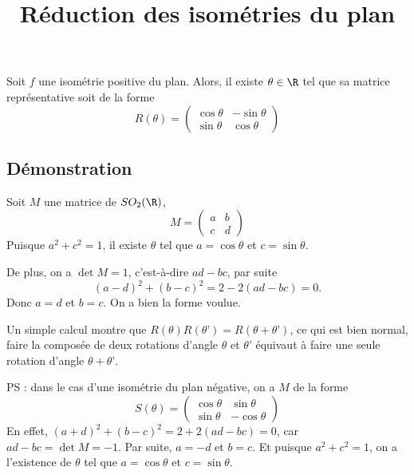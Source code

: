 \documentclass[fontsize=12pt,twoside=false,parskip=half]{scrartcl}
\title{Réduction des isométries du plan}
\date{}
\author{}
\begin{document}
\maketitle
   \begin{Theoreme}
      Soit $f$ une isométrie positive du plan. Alors, il existe $\theta \in \R$ 
      tel que sa matrice représentative soit de la forme
      \[
         R(\theta) = 
         \begin{pmatrix}
            \cos \theta & -\sin \theta \\
            \sin \theta & \cos \theta
         \end{pmatrix}
      \]
   \end{Theoreme}
   \subsection{Démonstration}
      Soit $M$ une matrice de $SO_2(\R)$, 
      \[
         M = 
         \begin{pmatrix}
            a & b \\
            c & d
         \end{pmatrix}
      \]
      Puisque $a^2 + c^2 = 1$, il existe $\theta$ tel que $a = \cos \theta$ et
      $c = \sin \theta$.
      
      De plus, on a $\det M = 1$, c’est-à-dire $ad - bc$, par suite
      \[
         (a - d)^2 + (b - c)^2 = 2 - 2(ad - bc) = 0.
      \]
      Donc $a = d$ et $b = c$. On a bien la forme voulue.
      
      Un simple calcul montre que $R(\theta)R(\theta’) = R(\theta + \theta’)$,
      ce qui est bien normal, faire la composée de deux rotations d’angle $\theta$ 
      et $\theta’$ équivaut à faire une seule rotation d’angle $\theta + \theta’$.
      
      PS : dans le cas d’une isométrie du plan négative, on a $M$ de la forme
      \[
         S(\theta) = 
         \begin{pmatrix}
            \cos \theta & \sin \theta \\
            \sin \theta & -\cos \theta
         \end{pmatrix}
      \]
      En effet, $(a + d)^2 + (b - c)^2 = 2 + 2(ad - bc) = 0$, car $ad - bc = \det M
      = -1$. Par suite, $a = -d$ et $b = c$. Et puisque $a^2 + c^2 = 1$, on a 
      l’existence de $\theta$ tel que $a = \cos \theta$ et $c = \sin \theta$.
\end{document}

